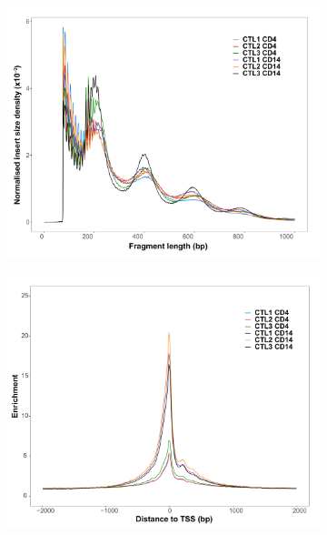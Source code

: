\begin{figure}[htbp]
\centering
\begin{subfigure}[b]{0.45\textwidth}
\centering
\includegraphics[width=\textwidth]{./Results1/pdfs/ATAC_Core_fresh_CD4_CD14_frag_size_distribution}
\caption{\textbf{}}
\end{subfigure}%
\begin{subfigure}[b]{0.45\textwidth}
\centering
\includegraphics[width=\textwidth]{./Results1/pdfs/TSS_enrichment_Core_fresh_CD4_CD14}
\caption{\textbf{}}
\end{subfigure}
\begin{subfigure}[b]{0.6\textwidth}

\end{subfigure}
\end{figure}
